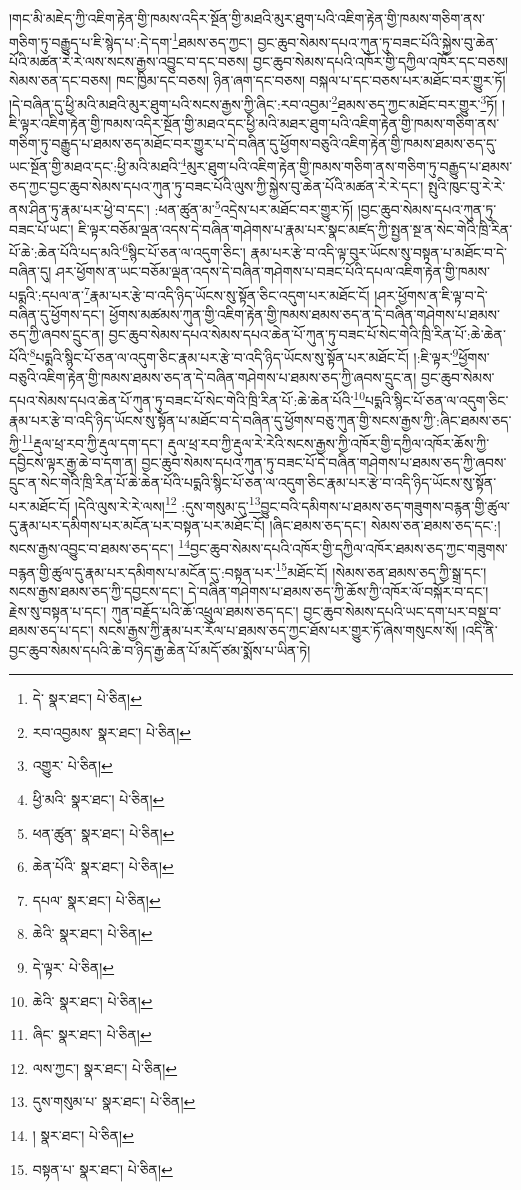 །གང་མི་མཇེད་ཀྱི་འཇིག་རྟེན་གྱི་ཁམས་འདིར་སྔོན་གྱི་མཐའི་མུར་ཐུག་པའི་འཇིག་རྟེན་གྱི་ཁམས་གཅིག་ནས་གཅིག་ཏུ་བརྒྱུད་པ་ཇི་སྙེད་པ་:དེ་དག་\footnote{དེ་  སྣར་ཐང་།  པེ་ཅིན། }ཐམས་ཅད་ཀྱང་། བྱང་ཆུབ་སེམས་དཔའ་ཀུན་ཏུ་བཟང་པོའི་སྐྱེས་བུ་ཆེན་པོའི་མཚན་རེ་རེ་ལས་སངས་རྒྱས་འབྱུང་བ་དང་བཅས། བྱང་ཆུབ་སེམས་དཔའི་འཁོར་གྱི་དཀྱིལ་འཁོར་དང་བཅས། སེམས་ཅན་དང་བཅས། ཁང་ཁྱིམ་དང་བཅས། ཉིན་ཞག་དང་བཅས། བསྐལ་པ་དང་བཅས་པར་མཐོང་བར་གྱུར་ཏོ། །དེ་བཞིན་དུ་ཕྱི་མའི་མཐའི་མུར་ཐུག་པའི་སངས་རྒྱས་ཀྱི་ཞིང་:རབ་འབྱམ་\footnote{རབ་འབྱམས་  སྣར་ཐང་།  པེ་ཅིན། }ཐམས་ཅད་ཀྱང་མཐོང་བར་གྱུར་\footnote{འགྱུར་  པེ་ཅིན། }ཏོ། །ཇི་ལྟར་འཇིག་རྟེན་གྱི་ཁམས་འདིར་སྔོན་གྱི་མཐའ་དང་ཕྱི་མའི་མཐར་ཐུག་པའི་འཇིག་རྟེན་གྱི་ཁམས་གཅིག་ནས་གཅིག་ཏུ་བརྒྱུད་པ་ཐམས་ཅད་མཐོང་བར་གྱུར་པ་དེ་བཞིན་དུ་ཕྱོགས་བཅུའི་འཇིག་རྟེན་གྱི་ཁམས་ཐམས་ཅད་དུ་ཡང་སྔོན་གྱི་མཐའ་དང་:ཕྱི་མའི་མཐའི་\footnote{ཕྱི་མའི་  སྣར་ཐང་།  པེ་ཅིན། }མུར་ཐུག་པའི་འཇིག་རྟེན་གྱི་ཁམས་གཅིག་ནས་གཅིག་ཏུ་བརྒྱུད་པ་ཐམས་ཅད་ཀྱང་བྱང་ཆུབ་སེམས་དཔའ་ཀུན་ཏུ་བཟང་པོའི་ལུས་ཀྱི་སྐྱེས་བུ་ཆེན་པོའི་མཚན་རེ་རེ་དང་། སྤུའི་ཁུང་བུ་རེ་རེ་ནས་ཤིན་ཏུ་རྣམ་པར་ཕྱེ་བ་དང་། :ཕན་ཚུན་མ་\footnote{ཕན་ཚུན་  སྣར་ཐང་།  པེ་ཅིན། }འདྲེས་པར་མཐོང་བར་གྱུར་ཏོ། །བྱང་ཆུབ་སེམས་དཔའ་ཀུན་ཏུ་བཟང་པོ་ཡང་། ཇི་ལྟར་བཅོམ་ལྡན་འདས་དེ་བཞིན་གཤེགས་པ་རྣམ་པར་སྣང་མཛད་ཀྱི་སྤྱན་སྔ་ན་སེང་གེའི་ཁྲི་རིན་པོ་ཆེ་:ཆེན་པོའི་པད་མའི་\footnote{ཆེན་པོའི་  སྣར་ཐང་།  པེ་ཅིན། }སྙིང་པོ་ཅན་ལ་འདུག་ཅིང་། རྣམ་པར་རྩེ་བ་འདི་ལྟ་བུར་ཡོངས་སུ་བསྟན་པ་མཐོང་བ་དེ་བཞིན་དུ། ཤར་ཕྱོགས་ན་ཡང་བཅོམ་ལྡན་འདས་དེ་བཞིན་གཤེགས་པ་བཟང་པོའི་དཔལ་འཇིག་རྟེན་གྱི་ཁམས་པདྨའི་:དཔལ་ན་\footnote{དཔལ་  སྣར་ཐང་།  པེ་ཅིན། }རྣམ་པར་རྩེ་བ་འདི་ཉིད་ཡོངས་སུ་སྟོན་ཅིང་འདུག་པར་མཐོང་ངོ། །ཤར་ཕྱོགས་ན་ཇི་ལྟ་བ་དེ་བཞིན་དུ་ཕྱོགས་དང་། ཕྱོགས་མཚམས་ཀུན་གྱི་འཇིག་རྟེན་གྱི་ཁམས་ཐམས་ཅད་ན་དེ་བཞིན་གཤེགས་པ་ཐམས་ཅད་ཀྱི་ཞབས་དྲུང་ན། བྱང་ཆུབ་སེམས་དཔའ་སེམས་དཔའ་ཆེན་པོ་ཀུན་ཏུ་བཟང་པོ་སེང་གེའི་ཁྲི་རིན་པོ་:ཆེ་ཆེན་པོའི་\footnote{ཆེའི་  སྣར་ཐང་།  པེ་ཅིན། }པདྨའི་སྙིང་པོ་ཅན་ལ་འདུག་ཅིང་རྣམ་པར་རྩེ་བ་འདི་ཉིད་ཡོངས་སུ་སྟོན་པར་མཐོང་ངོ། །:ཇི་ལྟར་\footnote{དེ་ལྟར་  པེ་ཅིན། }ཕྱོགས་བཅུའི་འཇིག་རྟེན་གྱི་ཁམས་ཐམས་ཅད་ན་དེ་བཞིན་གཤེགས་པ་ཐམས་ཅད་ཀྱི་ཞབས་དྲུང་ན། བྱང་ཆུབ་སེམས་དཔའ་སེམས་དཔའ་ཆེན་པོ་ཀུན་ཏུ་བཟང་པོ་སེང་གེའི་ཁྲི་རིན་པོ་:ཆེ་ཆེན་པོའི་\footnote{ཆེའི་  སྣར་ཐང་།  པེ་ཅིན། }པདྨའི་སྙིང་པོ་ཅན་ལ་འདུག་ཅིང་རྣམ་པར་རྩེ་བ་འདི་ཉིད་ཡོངས་སུ་སྟོན་པ་མཐོང་བ་དེ་བཞིན་དུ་ཕྱོགས་བཅུ་ཀུན་གྱི་སངས་རྒྱས་ཀྱི་:ཞིང་ཐམས་ཅད་ཀྱི་\footnote{ཞིང་  སྣར་ཐང་།  པེ་ཅིན། }རྡུལ་ཕྲ་རབ་ཀྱི་རྡུལ་དག་དང་། རྡུལ་ཕྲ་རབ་ཀྱི་རྡུལ་རེ་རེའི་སངས་རྒྱས་ཀྱི་འཁོར་གྱི་དཀྱིལ་འཁོར་ཆོས་ཀྱི་དབྱིངས་ལྟར་རྒྱ་ཆེ་བ་དག་ན། བྱང་ཆུབ་སེམས་དཔའ་ཀུན་ཏུ་བཟང་པོ་དེ་བཞིན་གཤེགས་པ་ཐམས་ཅད་ཀྱི་ཞབས་དྲུང་ན་སེང་གེའི་ཁྲི་རིན་པོ་ཆེ་ཆེན་པོའི་པདྨའི་སྙིང་པོ་ཅན་ལ་འདུག་ཅིང་རྣམ་པར་རྩེ་བ་འདི་ཉིད་ཡོངས་སུ་སྟོན་པར་མཐོང་ངོ། །དེའི་ལུས་རེ་རེ་ལས།\footnote{ལས་ཀྱང་།  སྣར་ཐང་།  པེ་ཅིན། } :དུས་གསུམ་དུ་\footnote{དུས་གསུམ་པ་  སྣར་ཐང་།  པེ་ཅིན། }བྱུང་བའི་དམིགས་པ་ཐམས་ཅད་གཟུགས་བརྙན་གྱི་ཚུལ་དུ་རྣམ་པར་དམིགས་པར་མངོན་པར་བསྟན་པར་མཐོང་ངོ། །ཞིང་ཐམས་ཅད་དང་། སེམས་ཅན་ཐམས་ཅད་དང་:།སངས་རྒྱས་འབྱུང་བ་ཐམས་ཅད་དང་། \footnote{།   སྣར་ཐང་།  པེ་ཅིན། }བྱང་ཆུབ་སེམས་དཔའི་འཁོར་གྱི་དཀྱིལ་འཁོར་ཐམས་ཅད་ཀྱང་གཟུགས་བརྙན་གྱི་ཚུལ་དུ་རྣམ་པར་དམིགས་པ་མངོན་དུ་:བསྟན་པར་\footnote{བསྟན་པ་  སྣར་ཐང་།  པེ་ཅིན། }མཐོང་ངོ། །སེམས་ཅན་ཐམས་ཅད་ཀྱི་སྒྲ་དང་། སངས་རྒྱས་ཐམས་ཅད་ཀྱི་དབྱངས་དང་། དེ་བཞིན་གཤེགས་པ་ཐམས་ཅད་ཀྱི་ཆོས་ཀྱི་འཁོར་ལོ་བསྐོར་བ་དང་། རྗེས་སུ་བསྟན་པ་དང་། ཀུན་བརྗོད་པའི་ཆོ་འཕྲུལ་ཐམས་ཅད་དང་། བྱང་ཆུབ་སེམས་དཔའི་ཡང་དག་པར་བསྡུ་བ་ཐམས་ཅད་པ་དང་། སངས་རྒྱས་ཀྱི་རྣམ་པར་རོལ་པ་ཐམས་ཅད་ཀྱང་ཐོས་པར་གྱུར་ཏོ་ཞེས་གསུངས་སོ། །འདི་ནི་བྱང་ཆུབ་སེམས་དཔའི་ཆེ་བ་ཉིད་རྒྱ་ཆེན་པོ་མདོ་ཙམ་སྨོས་པ་ཡིན་ཏེ། 